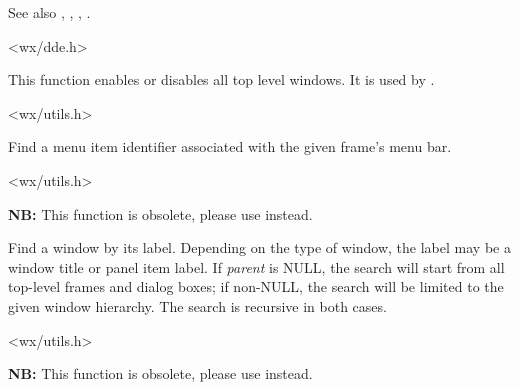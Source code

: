 See also , , ,\rtfsp
{}.


<wx/dde.h>


\label{wxenabletoplevelwindows}


This function enables or disables all top level windows. It is used by
.


<wx/utils.h>


\label{wxfindmenuitemid}


Find a menu item identifier associated with the given frame's menu bar.


<wx/utils.h>


\label{wxfindwindowbylabel}


{\bf NB:} This function is obsolete, please use
 instead.

Find a window by its label. Depending on the type of window, the label may be a window title
or panel item label. If {\it parent} is NULL, the search will start from all top-level
frames and dialog boxes; if non-NULL, the search will be limited to the given window hierarchy.
The search is recursive in both cases.


<wx/utils.h>


\label{wxfindwindowbyname}


{\bf NB:} This function is obsolete, please use
 instead.

